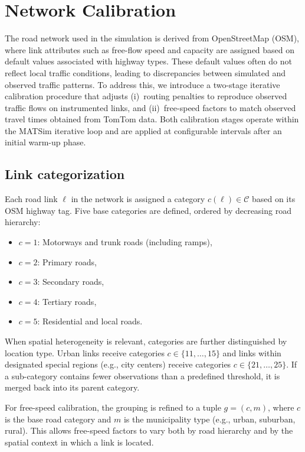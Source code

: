 
\section{Network Calibration}
\label{sec:network_calibration}

The road network used in the simulation is derived from OpenStreetMap (OSM), where link attributes such as free-flow speed and capacity are assigned based on default values associated with highway types. These default values often do not reflect local traffic conditions, leading to discrepancies between simulated and observed traffic patterns. To address this, we introduce a two-stage iterative calibration procedure that adjusts (i)~routing penalties to reproduce observed traffic flows on instrumented links, and (ii)~free-speed factors to match observed travel times obtained from TomTom data. Both calibration stages operate within the MATSim iterative loop and are applied at configurable intervals after an initial warm-up phase.

\subsection{Link categorization}

Each road link $\ell$ in the network is assigned a category $c(\ell) \in \mathcal{C}$ based on its OSM highway tag. Five base categories are defined, ordered by decreasing road hierarchy:

\begin{itemize}
    \item $c = 1$: Motorways and trunk roads (including ramps),
    \item $c = 2$: Primary roads,
    \item $c = 3$: Secondary roads,
    \item $c = 4$: Tertiary roads,
    \item $c = 5$: Residential and local roads.
\end{itemize}

When spatial heterogeneity is relevant, categories are further distinguished by location type. Urban links receive categories $c \in \{11,\ldots,15\}$ and links within designated special regions (e.g., city centers) receive categories $c \in \{21,\ldots,25\}$. If a sub-category contains fewer observations than a predefined threshold, it is merged back into its parent category.

For free-speed calibration, the grouping is refined to a tuple $g = (c, m)$, where $c$ is the base road category and $m$ is the municipality type (e.g., urban, suburban, rural). This allows free-speed factors to vary both by road hierarchy and by the spatial context in which a link is located.

